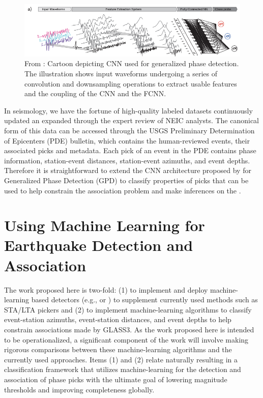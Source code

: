 \documentclass[12p]{article}
\begin{document}
\begin{figure}[!htb]
  \center\includegraphics[width=\textwidth]{figures/cnn_architecture_ross2018a.png}
  \caption{\label{fig:cnn} From \cite{Ross2018b}: Cartoon depicting CNN used for generalized phase detection. The illustration shows input waveforms undergoing a series of convolution and downsampling operations to extract usable features and the coupling of the CNN and the FCNN.}
\end{figure}

In seismology, we have the fortune of high-quality labeled datasets continuously updated an expanded through the expert review of NEIC analysts. The canonical form of this data can be accessed through the USGS Preliminary Determination of Epicenters (PDE) bulletin, which contains the human-reviewed events, their associated picks and metadata. Each pick of an event in the PDE contains phase information, station-event distances, station-event azimuths, and event depths. Therefore it is straightforward to extend the CNN architecture proposed by \citet{Ross2018b} for Generalized Phase Detection (GPD) to classify properties of picks that can be used to help constrain the association problem and make inferences on the .

\section*{Using Machine Learning for Earthquake Detection and Association}

The work proposed here is two-fold: (1) to implement and deploy machine-learning based detectors (e.g., \citet{Perol2018} or \citet{Ross2018a}) to supplement currently used methods such as STA/LTA pickers and (2) to implement machine-learning algorithms to classify event-station azimuths, event-station distances, and event depths to help constrain associations made by GLASS3. As the work proposed here is intended to be operationalized, a significant component of the work will involve making rigorous comparisons between these machine-learning algorithms and the currently used approaches. Items (1) and (2) relate naturally resulting in a classification framework that utilizes machine-learning for the detection and association of phase picks with the ultimate goal of lowering magnitude thresholds and improving completeness globally.
\end{document}
